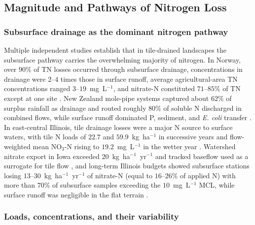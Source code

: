 \subsection{Magnitude and Pathways of Nitrogen Loss}

\subsubsection{Subsurface drainage as the dominant nitrogen pathway}

Multiple independent studies establish that in tile-drained landscapes
the subsurface pathway carries the overwhelming majority of nitrogen.
In Norway, over $90\%$ of TN losses occurred through subsurface drainage,
concentrations in drainage were $2$--$4$ times those in surface runoff,
average agricultural-area TN concentrations ranged $3$--$19$~mg~L$^{-1}$,
and nitrate-N constituted $71$--$85\%$ of TN except at one site
\parencite{Bechmann2014}. New Zealand mole-pipe systems captured about
$62\%$ of surplus rainfall as drainage and routed roughly $80\%$ of
soluble N discharged in combined flows, while surface runoff dominated
P, sediment, and \emph{E. coli} transfer \parencite{Monaghan2016}. In
east-central Illinois, tile drainage losses were a major N source to
surface waters, with tile N loads of $22.7$ and $59.9$~kg~ha$^{-1}$ in
successive years and flow-weighted mean NO$_3$-N rising to $19.2$~mg~L$^{-1}$
in the wetter year \parencite{Gentry2009}. Watershed nitrate export in
Iowa exceeded $20$~kg~ha$^{-1}$~yr$^{-1}$ and tracked baseflow used as a
surrogate for tile flow \parencite{Tomer2008}, and long-term Illinois
budgets showed subsurface stations losing $13$--$30$~kg~ha$^{-1}$~yr$^{-1}$
of nitrate-N (equal to $16$--$26\%$ of applied N) with more than $70\%$ of
subsurface samples exceeding the $10$~mg~L$^{-1}$ MCL, while surface runoff
was negligible in the flat terrain \parencite{Dattamudi2020}.

\subsubsection{Loads, concentrations, and their variability}

